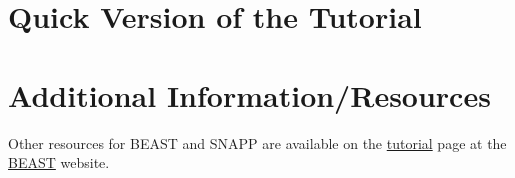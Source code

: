 \documentclass{article}
\newcommand{\program}[1]{#1\xspace}
\newcommand{\beast}{\href{http://beast2.org}{\program{BEAST}}\xspace}
\begin{document}
\newpage
\section{Quick Version of the Tutorial}
\setcounter{stepCounter}{0}
\renewcommand{\step}[2]{\addtocounter{stepCounter}{1} {\bf \hyperlink{step\arabic{stepCounter}}{Step \arabic{stepCounter}}:}\xspace #1\par}
\renewcommand{\intermediate}[1]{}


\newpage
\section{Additional Information/Resources}
Other resources for BEAST and SNAPP are available on the \href{http://beast2.org/tutorials}{tutorial} page at the \beast website.

\newpage

\end{document}
